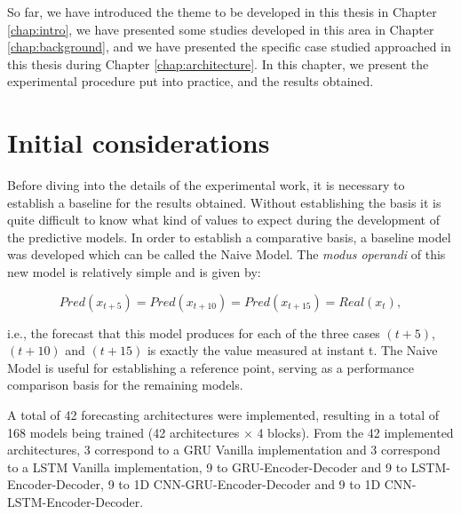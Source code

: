 \cleardoublepage
\label{chap:results}

So far, we have introduced the theme to be developed in this thesis in Chapter \ref{chap:intro}, we have presented some studies developed in this area in Chapter \ref{chap:background}, and we have presented the specific case studied approached in this thesis during Chapter \ref{chap:architecture}. In this chapter, we present the experimental procedure put into practice, and the results obtained.



\section{Initial considerations}

Before diving into the details of the experimental work, it is necessary to establish a baseline for the results obtained. Without establishing the basis it is quite difficult to know what kind of values to expect during the development of the predictive models. In order to establish a comparative basis, a baseline model was developed which can be called the Naive Model. The \textit{modus operandi} of this new model is relatively simple and is given by:

\begin{equation}
   Pred(x_{t+5}) = Pred(x_{t+10}) = Pred(x_{t+15}) = Real(x_{t}),
   \label{naive}
\end{equation}

i.e., the forecast that this model produces for each of the three cases $(t+5)$, $(t+10)$ and $(t+15)$ is exactly the value measured at instant t. The Naive Model is useful for establishing a reference point, serving as a performance comparison basis for the remaining models.

A total of 42 forecasting architectures were implemented, resulting in a total of 168 models being trained (42 architectures $\times$ 4 blocks). From the 42 implemented architectures, 3 correspond to a \ac{GRU} Vanilla implementation and 3 correspond to a \ac{LSTM} Vanilla implementation, 9 to \ac{GRU}-Encoder-Decoder and 9 to \ac{LSTM}-Encoder-Decoder, 9 to \ac{1D CNN}-\ac{GRU}-Encoder-Decoder and 9 to \ac{1D CNN}-\ac{LSTM}-Encoder-Decoder.

